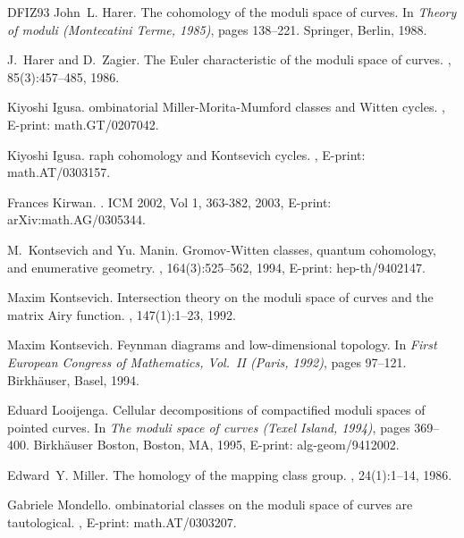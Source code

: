 \documentclass[11pt,twoside]{article}
\theoremstyle{plain}
\theoremstyle{remark}
\theoremstyle{definition}
\numberwithin{equation}{section} %
\begin{document}
\begin{thebibliography}{DFIZ93}
John~L. Harer.
\newblock The cohomology of the moduli space of curves.
\newblock In {\em Theory of moduli (Montecatini Terme, 1985)}, pages 138--221.
  Springer, Berlin, 1988.

J.~Harer and D.~Zagier.
\newblock The {E}uler characteristic of the moduli space of curves.
, 85(3):457--485, 1986.

Kiyoshi Igusa.
ombinatorial {M}iller-{M}orita-{M}umford classes and {W}itten
  cycles.
, E-print: math.GT/0207042.

Kiyoshi Igusa.
raph cohomology and {K}ontsevich cycles.
, E-print: math.AT/0303157.

Frances Kirwan.
.
\newblock ICM 2002, Vol 1, 363-382, 2003, E-print: arXiv:math.AG/0305344.

M.~Kontsevich and Yu. Manin.
\newblock Gromov-{W}itten classes, quantum cohomology, and enumerative
  geometry.
, 164(3):525--562, 1994, E-print:
  hep-th/9402147.

Maxim Kontsevich.
\newblock Intersection theory on the moduli space of curves and the matrix
  {A}iry function.
, 147(1):1--23, 1992.

Maxim Kontsevich.
\newblock Feynman diagrams and low-dimensional topology.
\newblock In {\em First European Congress of Mathematics, Vol.\ II (Paris,
  1992)}, pages 97--121. Birkh{\"a}user, Basel, 1994.

Eduard Looijenga.
\newblock Cellular decompositions of compactified moduli spaces of pointed
  curves.
\newblock In {\em The moduli space of curves (Texel Island, 1994)}, pages
  369--400. Birkh{\"a}user Boston, Boston, MA, 1995, E-print: alg-geom/9412002.

Edward~Y. Miller.
\newblock The homology of the mapping class group.
, 24(1):1--14, 1986.

Gabriele Mondello.
ombinatorial classes on the moduli space of curves are
  tautological.
, E-print: math.AT/0303207.


\end{thebibliography}
\end{document}
